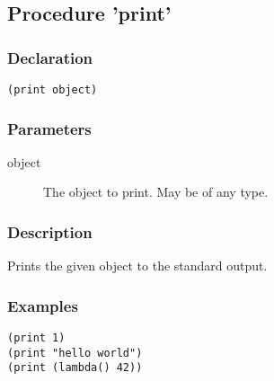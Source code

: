 \subsection{Procedure 'print'}
\label{builtins/print}

\subsubsection*{Declaration}
\begin{lstlisting}
(print object)
\end{lstlisting}

\subsubsection*{Parameters}
\begin{description}
	\item[object] The object to print. May be of any type.
\end{description}

\subsubsection*{Description}
Prints the given object to the standard output.

\subsubsection*{Examples}
\begin{lstlisting}
(print 1)
(print "hello world")
(print (lambda() 42))
\end{lstlisting}
